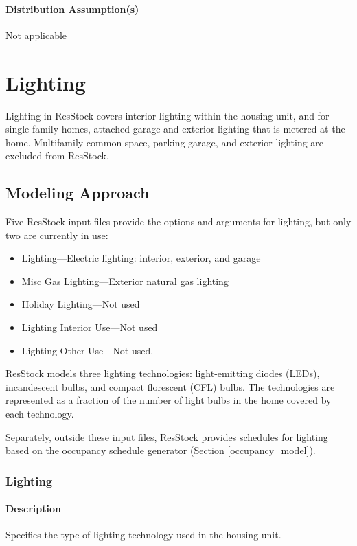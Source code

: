 \paragraph{Distribution Assumption(s)}
Not applicable


\section{Lighting}
Lighting in ResStock covers interior lighting within the housing unit, and for single-family homes, attached garage and exterior lighting that is metered at the home. Multifamily common space, parking garage, and exterior lighting are excluded from ResStock. 

\subsection{Modeling Approach}
Five ResStock input files provide the options and arguments for lighting, but only two are currently in use:
\begin{itemize}
    \item{Lighting}---Electric lighting: interior, exterior, and garage 
    \item{Misc Gas Lighting}---Exterior natural gas lighting
    \item{Holiday Lighting}---Not used
    \item{Lighting Interior Use}---Not used
    \item{Lighting Other Use}---Not used.
\end{itemize}

ResStock models three lighting technologies: light-emitting diodes (LEDs), incandescent bulbs, and compact florescent (CFL) bulbs. The technologies are represented as a fraction of the number of light bulbs in the home covered by each technology.

Separately, outside these input files, ResStock provides schedules for lighting based on the occupancy schedule generator (Section \ref{occupancy_model}).

\subsubsection{Lighting}\label{lighting}

\paragraph{Description}
Specifies the type of lighting technology used in the housing unit.

